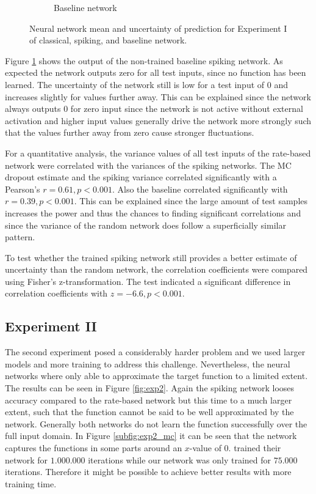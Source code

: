 \documentclass[10pt,a4paper,twocolumn]{article}
\begin{document}
\begin{figure}[t]
\begin{subfigure}[t]{0.3\textwidth}
\caption{Baseline network}\label{subfig:exp1_base}
\end{subfigure}
\caption{Neural network mean and uncertainty of prediction for Experiment I of classical, spiking, and baseline network.}\label{fig:exp1}
\end{figure}

Figure \ref{subfig:exp1_base} shows the output of the non-trained baseline spiking network. As expected the network outputs zero for all test inputs, since no function has been learned. The uncertainty of the network still is low for a test input of 0 and increases slightly for values further away. This can be explained since the network always outputs 0 for zero input since the network is not active without external activation and higher input values generally drive the network more strongly such that the values further away from zero cause stronger fluctuations. 

For a quantitative analysis, the variance values of all test inputs of the rate-based network were correlated with the variances of the spiking networks. The MC dropout estimate and the spiking variance correlated significantly with a Pearson's $r = 0.61, p < 0.001$. Also the baseline correlated significantly with $r = 0.39, p < 0.001$. This can be explained since the large amount of test samples increases the power and thus the chances to finding significant correlations and since the variance of the random network does follow a superficially similar pattern. 

To test whether the trained spiking network still provides a better estimate of uncertainty than the random network, the correlation coefficients were compared using Fisher's z-transformation. The test indicated a significant difference in correlation coefficients with $z = -6.6, p < 0.001$.


\subsection{Experiment II}

The second experiment posed a considerably harder problem and we used larger models and more training to address this challenge. Nevertheless, the neural networks where only able to approximate the target function to a limited extent. The results can be seen in Figure \ref{fig:exp2}. Again the spiking network looses accuracy compared to the rate-based network but this time to a much larger extent, such that the function cannot be said to be well approximated by the network. Generally both networks do not learn the function successfully over the full input domain. In Figure \ref{subfig:exp2_mc} it can be seen that the network captures the functions in some parts around an $x$-value of 0.  trained their network for $1.000.000$ iterations while our network was only trained for $75.000$ iterations. Therefore it might be possible to achieve better results with more training time. 
\end{document}
